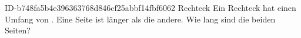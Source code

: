 \begin{exercise}
      {ID-b748fa5b4e396363768d846cf25abbf14fbf6062}
      {Rechteck}
  \ifproblem\problem
    Ein Rechteck hat einen Umfang von . Eine Seite ist  länger
    als die andere. Wie lang sind die beiden Seiten?
  \fi
\end{exercise}
